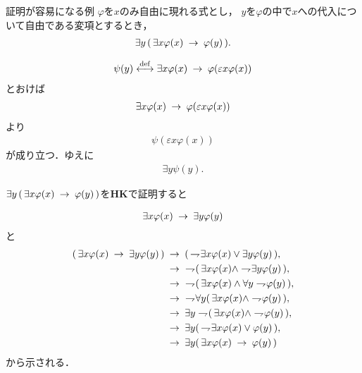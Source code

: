 \newpage
	\begin{itembox}[l]{証明が容易になる例}
		$\varphi$を$x$のみ自由に現れる式とし，
		$y$を$\varphi$の中で$x$への代入について自由である変項とするとき，
		\begin{align}
			\exists y\, (\, \exists x \varphi(x) \hspace{0.25em}\rightarrow\hspace{0.25em} \varphi(y)\, ).
		\end{align}
	\end{itembox}
	
	\begin{sketch}
		\begin{align}
			\psi(y) \overset{\mathrm{def}}{\longleftrightarrow} \exists x \varphi(x) \hspace{0.25em}\rightarrow\hspace{0.25em} \varphi(\varepsilon x \varphi(x))
		\end{align}
		とおけば
		\begin{align}
			\exists x \varphi(x) \hspace{0.25em}\rightarrow\hspace{0.25em} \varphi(\varepsilon x \varphi(x))
		\end{align}
		より
		\begin{align}
			\psi(\varepsilon x \varphi(x))
		\end{align}
		が成り立つ．ゆえに
		\begin{align}
			\exists y \psi(y).
		\end{align}
	\end{sketch}

\newpage
	$\exists y\, (\, \exists x \varphi(x) \hspace{0.25em}\rightarrow\hspace{0.25em} \varphi(y)\, )$を{\bf HK}で証明すると
	
	\begin{align}
		\exists x \varphi(x) \hspace{0.25em}\rightarrow\hspace{0.25em} \exists y \varphi(y)
	\end{align}
	と
	\begin{align}
		(\, \exists x \varphi(x) \rarrow \exists y \varphi(y) \, )
		&\rarrow (\, \negation \exists x \varphi(x) \vee \exists y \varphi(y) \, ), \\
		&\rarrow\ \negation (\, \exists x \varphi(x) \wedge \negation \exists y \varphi(y) \, ), \\
		&\rarrow\ \negation (\, \exists x \varphi(x) \wedge \forall y \negation \varphi(y) \, ), \\
		&\rarrow\ \negation \forall y (\, \exists x \varphi(x) \wedge \negation \varphi(y) \, ), \\
		&\rarrow \exists y \negation (\, \exists x \varphi(x) \wedge \negation \varphi(y) \, ), \\
		&\rarrow \exists y (\, \negation \exists x \varphi(x) \vee \varphi(y) \, ), \\
		&\rarrow \exists y (\, \exists x \varphi(x) \rarrow \varphi(y) \, )
	\end{align}
	から示される．